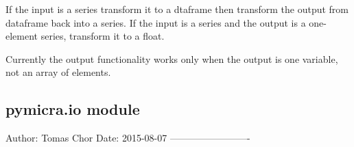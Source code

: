 \documentclass[a4paper,10pt,english]{sphinxmanual}
\begin{document}

\begin{fulllineitems}
\label{pymicra:pymicra.decorators.pdgeneral}
\end{fulllineitems}


\begin{fulllineitems}
\label{pymicra:pymicra.decorators.pdgeneral_in}
\end{fulllineitems}


\begin{fulllineitems}
\label{pymicra:pymicra.decorators.pdgeneral_io}
If the input is a series transform it to a dtaframe then transform the output from dataframe
back into a series. If the input is a series and the output is a one-element series, transform it to a float.

Currently the output functionality works only when the output is one variable, not an array
of elements.

\end{fulllineitems}



\subsection{pymicra.io module}
\label{pymicra:module-pymicra.io}\label{pymicra:pymicra-io-module}
Author: Tomas Chor
Date: 2015-08-07
-------------------------

\begin{fulllineitems}
\label{pymicra:pymicra.io.dataset}
\end{fulllineitems}

\end{document}
